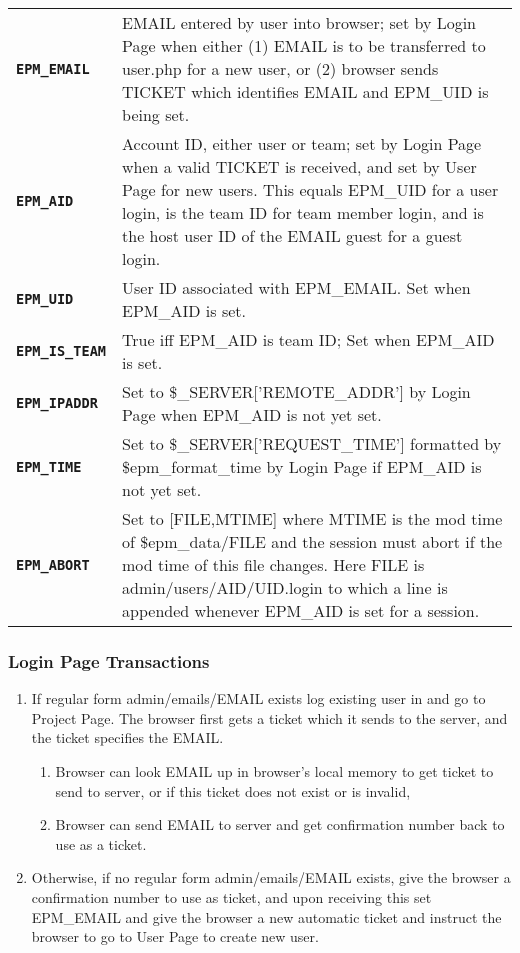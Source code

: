 \documentclass[12pt]{article}
\newenvironment{indpar}[1][0.4in]%
	{\begin{list}{}%
		     {\setlength{\itemsep}{0in}%
		      \setlength{\topsep}{0in}%
		      \setlength{\parsep}{1ex}%
		      \setlength{\labelwidth}{#1}%
		      \setlength{\leftmargin}{#1}%
		      \addtolength{\leftmargin}{\labelsep}}%
	 \item}%
	{\end{list}}
\newcommand{\TT}[1]{{\tt \bfseries #1}}
\newcommand{\EOL}{\penalty \exhyphenpenalty}
\begin{document}
\begin{indpar}[0.2in]
\begin{tabular}[t]{lp{4.5in}}
\TT{EPM\_EMAIL}\label{EPM_EMAIL}
    & EMAIL entered by user into browser; set by Login Page when either
      (1) EMAIL is to be transferred to user.php for a new user,
      or (2) browser sends TICKET which identifies
      EMAIL and EPM\_UID is being set.
\\[0.5ex]
\TT{EPM\_AID}\label{EPM_AID}
    & Account ID, either user or team; set by Login Page when a valid
      TICKET is received, and set by User Page for new users.
      This equals EPM\_UID for a user login, is the team ID for
      team member login, and is the host user ID of the EMAIL guest for
      a guest login. 
\\[0.5ex]
\TT{EPM\_UID}\label{EPM_UID}
    & User ID associated with EPM\_EMAIL.
      Set when EPM\_\EOL AID is set.
\\[0.5ex]
\TT{EPM\_IS\_TEAM}\label{EPM_IS_TEAM}
    & True iff EPM\_AID is team ID;
      Set when EPM\_AID is set.
\\[0.5ex]
\TT{EPM\_IPADDR}\label{EPM_IPADDR}
    & Set to \$\_SERVER['REMOTE\_ADDR'] by Login Page when EPM\_\EOL AID is
      not yet set.
\\[0.5ex]
\TT{EPM\_TIME}\label{EPM_TIME}
    & Set to \$\_SERVER['REQUEST\_TIME'] formatted by \$epm\_\EOL format\_time
      by Login Page if EPM\_AID is not yet set.
\\[0.5ex]
\TT{EPM\_ABORT}\label{EPM_ABORT}
    & Set to [FILE,MTIME] where MTIME is the mod time of \$epm\_data/FILE
      and the session must abort if the mod time of this file changes.
      Here FILE is admin/users/AID/UID.login to which a line is appended
      whenever EPM\_AID is set for a session.
\end{tabular}
\end{indpar}


\subsubsection{Login Page Transactions}

\begin{enumerate}
\item If regular form admin/emails/EMAIL exists
      log existing user in and go to Project Page.  The browser
      first gets a ticket which it sends to the server, and
      the ticket specifies the EMAIL.
\begin{enumerate}
\item Browser can look EMAIL up in browser's local memory to get
      ticket to send to server, or if this ticket does not exist
      or is invalid,
\item Browser can send EMAIL to server and get confirmation number back to use
      as a ticket.
\end{enumerate}
\item Otherwise, if no regular form admin/emails/EMAIL exists, give
      the browser a confirmation number to use as ticket, and upon
      receiving this set EPM\_EMAIL and give the browser a new
      automatic ticket and instruct the browser to
      go to User Page to create new user.
\end{enumerate}
\end{document}

